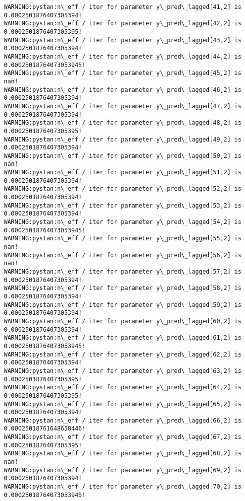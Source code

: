 \documentclass[11pt]{article}
\begin{document}
\begin{Verbatim}[commandchars=\\\{\}]
WARNING:pystan:n\_eff / iter for parameter y\_pred\_lagged[41,2] is 0.0002501876407305394!
WARNING:pystan:n\_eff / iter for parameter y\_pred\_lagged[42,2] is 0.0002501876407305395!
WARNING:pystan:n\_eff / iter for parameter y\_pred\_lagged[43,2] is 0.0002501876407305394!
WARNING:pystan:n\_eff / iter for parameter y\_pred\_lagged[44,2] is 0.00025018764073053945!
WARNING:pystan:n\_eff / iter for parameter y\_pred\_lagged[45,2] is nan!
WARNING:pystan:n\_eff / iter for parameter y\_pred\_lagged[46,2] is 0.0002501876407305394!
WARNING:pystan:n\_eff / iter for parameter y\_pred\_lagged[47,2] is 0.0002501876407305394!
WARNING:pystan:n\_eff / iter for parameter y\_pred\_lagged[48,2] is 0.0002501876407305395!
WARNING:pystan:n\_eff / iter for parameter y\_pred\_lagged[49,2] is 0.0002501876407305394!
WARNING:pystan:n\_eff / iter for parameter y\_pred\_lagged[50,2] is nan!
WARNING:pystan:n\_eff / iter for parameter y\_pred\_lagged[51,2] is 0.0002501876407305394!
WARNING:pystan:n\_eff / iter for parameter y\_pred\_lagged[52,2] is 0.0002501876407305394!
WARNING:pystan:n\_eff / iter for parameter y\_pred\_lagged[53,2] is 0.0002501876407305394!
WARNING:pystan:n\_eff / iter for parameter y\_pred\_lagged[54,2] is 0.00025018764073053945!
WARNING:pystan:n\_eff / iter for parameter y\_pred\_lagged[55,2] is nan!
WARNING:pystan:n\_eff / iter for parameter y\_pred\_lagged[56,2] is nan!
WARNING:pystan:n\_eff / iter for parameter y\_pred\_lagged[57,2] is 0.0002501876407305394!
WARNING:pystan:n\_eff / iter for parameter y\_pred\_lagged[58,2] is 0.0002501876407305394!
WARNING:pystan:n\_eff / iter for parameter y\_pred\_lagged[59,2] is 0.0002501876407305394!
WARNING:pystan:n\_eff / iter for parameter y\_pred\_lagged[60,2] is 0.0002501876407305394!
WARNING:pystan:n\_eff / iter for parameter y\_pred\_lagged[61,2] is 0.00025018764073053945!
WARNING:pystan:n\_eff / iter for parameter y\_pred\_lagged[62,2] is 0.0002501876407305394!
WARNING:pystan:n\_eff / iter for parameter y\_pred\_lagged[63,2] is 0.0002501876407305395!
WARNING:pystan:n\_eff / iter for parameter y\_pred\_lagged[64,2] is 0.0002501876407305395!
WARNING:pystan:n\_eff / iter for parameter y\_pred\_lagged[65,2] is 0.0002501876407305394!
WARNING:pystan:n\_eff / iter for parameter y\_pred\_lagged[66,2] is 0.00025018761648658446!
WARNING:pystan:n\_eff / iter for parameter y\_pred\_lagged[67,2] is 0.0002501876407305395!
WARNING:pystan:n\_eff / iter for parameter y\_pred\_lagged[68,2] is nan!
WARNING:pystan:n\_eff / iter for parameter y\_pred\_lagged[69,2] is 0.0002501876407305394!
WARNING:pystan:n\_eff / iter for parameter y\_pred\_lagged[70,2] is 0.00025018764073053945!

\end{Verbatim}
\end{document}

